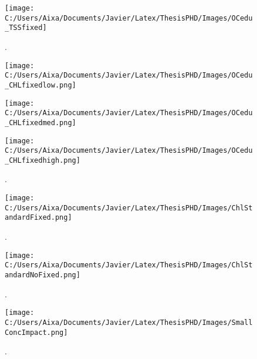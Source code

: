\begin{figure}[htb]
\centering
      \texttt{[image: C:/Users/Aixa/Documents/Javier/Latex/ThesisPHD/Images/OCedu\_TSSfixed]}
      \caption{.\label{fig:TSSfixed} } 
\end{figure}

\begin{figure}[htb]
  \begin{minipage}[c]{0.48\linewidth}
    \centering
      \texttt{[image: C:/Users/Aixa/Documents/Javier/Latex/ThesisPHD/Images/OCedu\_CHLfixedlow.png]}
    \end{minipage}
   \hfill   
   \begin{minipage}[c]{0.48\linewidth}
    \centering
      \texttt{[image: C:/Users/Aixa/Documents/Javier/Latex/ThesisPHD/Images/OCedu\_CHLfixedmed.png]}
  \end{minipage}    
  \begin{minipage}[c]{1.0\linewidth}
    \centering
      \texttt{[image: C:/Users/Aixa/Documents/Javier/Latex/ThesisPHD/Images/OCedu\_CHLfixedhigh.png]}
  \end{minipage}    
      \caption{.\label{fig:OCedu_CHLfixed} }
\end{figure}

\begin{figure}[htb]
\centering
      \texttt{[image: C:/Users/Aixa/Documents/Javier/Latex/ThesisPHD/Images/ChlStandardFixed.png]}
      \caption{.\label{fig:ChlStandardFixed} } 
\end{figure}

\begin{figure}[htb]
\centering
      \texttt{[image: C:/Users/Aixa/Documents/Javier/Latex/ThesisPHD/Images/ChlStandardNoFixed.png]}
      \caption{.\label{fig:ChlStandardNoFixed} } 
\end{figure}

\begin{figure}[htb]
\centering
      \texttt{[image: C:/Users/Aixa/Documents/Javier/Latex/ThesisPHD/Images/SmallConcImpact.png]}
      \caption{.\label{fig:SmallConcImpact} } 
\end{figure}


